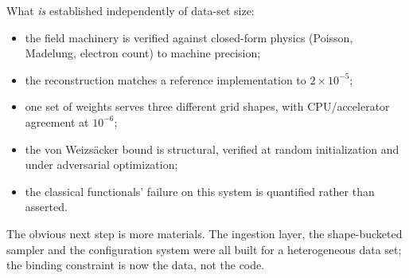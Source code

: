 What \emph{is} established independently of data-set size:

\begin{itemize}
  \item the field machinery is verified against closed-form physics
    (Poisson, Madelung, electron count) to machine precision;
  \item the  reconstruction matches a reference implementation to
    $2\times10^{-5}$;
  \item one set of weights serves three different grid shapes, with
    CPU/accelerator agreement at $10^{-6}$;
  \item the von Weizsäcker bound is structural, verified at random
    initialization and under adversarial optimization;
  \item the classical functionals' failure on this system is quantified rather
    than asserted.
\end{itemize}

The obvious next step is more materials. The ingestion layer, the shape-bucketed
sampler and the configuration system were all built for a heterogeneous data
set; the binding constraint is now the data, not the code.
